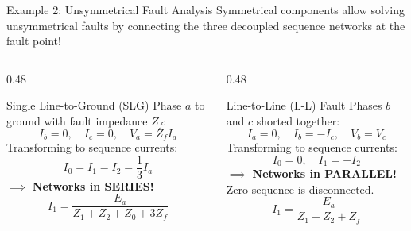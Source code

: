 \begin{frame}[allowframebreaks]{Example 2: Unsymmetrical Fault Analysis}
    Symmetrical components allow solving unsymmetrical faults by connecting the three decoupled sequence networks at the fault point!

    \begin{columns}
        \begin{column}{0.48\textwidth}
            \begin{block}{Single Line-to-Ground (SLG)}
                Phase $a$ to ground with fault impedance $Z_f$:
                \begin{equation}
                    I_b = 0, \quad I_c = 0, \quad V_a = Z_f I_a
                \end{equation}
                Transforming to sequence currents:
                \begin{equation}
                    I_0 = I_1 = I_2 = \frac{1}{3} I_a
                \end{equation}
                $\implies$ \alert{\textbf{Networks in SERIES!}}
                \begin{equation}
                    I_1 = \frac{E_a}{Z_1 + Z_2 + Z_0 + 3 Z_f}
                \end{equation}
            \end{block}
        \end{column}

        \begin{column}{0.48\textwidth}
            \begin{block}{Line-to-Line (L-L) Fault}
                Phases $b$ and $c$ shorted together:
                \begin{equation}
                    I_a = 0, \quad I_b = -I_c, \quad V_b = V_c
                \end{equation}
                Transforming to sequence currents:
                \begin{equation}
                    I_0 = 0, \quad I_1 = -I_2
                \end{equation}
                $\implies$ \alert{\textbf{Networks in PARALLEL!}}
                Zero sequence is disconnected.
                \begin{equation}
                    I_1 = \frac{E_a}{Z_1 + Z_2 + Z_f}
                \end{equation}
            \end{block}
        \end{column}
    \end{columns}
\end{frame}

